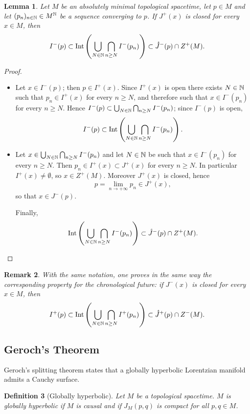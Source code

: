 \documentclass[a4paper,twoside]{article}
\newtheorem{lem}{Lemma}[section]
\newtheorem{defi}[lem]{Definition}
\newtheorem{rem}[lem]{Remark}
\begin{document}
\begin{lem}\label{lem:cup_cap} Let $M$ be an absolutely minimal topological spacetime, let $p\in M$ and let $(p_n)_{n\in \mathbb{N}}\in M^{\mathbb{N}}$ be a sequence converging to
$p$.
If $J^+(x)$ is closed for every $x\in M$, then
$$I^{-}(p)\subset \mathrm{Int}\left(\bigcup_{N\in \N}\bigcap_{n\geq N} I^-(p_n)\right)\subset \ring J^-(p) \cap Z^{+}(M). $$
\end{lem}
\begin{proof} \
\begin{itemize}
\item Let $x\in I^-(p)$; then $p\in I^+(x)$. Since $I^+(x)$ is open there exists $N\in \mathbb{N}$ such that $p_n\in I^+(x)$ for every $n\geq N$,
and therefore such that $x\in I^-(p_n)$ for every $n\geq N$.
Hence $I^-(p)\subset \bigcup_{N\in \mathbb{N}}\bigcap_{n\geq N} I^-(p_n)$;
since $I^-(p)$ is open, $$I^{-}(p)\subset \mathrm{Int}\left(\bigcup_{N\in \mathbb{N}}\bigcap_{n\geq N} I^-(p_n)\right).$$

\item Let $x\in \bigcup_{N\in \mathbb{N}}\bigcap_{n\geq N} I^-(p_n)$ and let $N\in \mathbb{N}$ be such that
$x\in I^-(p_n)$ for every $n\geq N$.
Then $p_n\in I^+(x)\subset J^+(x)$ for every $n\geq N$.
In particular $I^+(x)\neq \emptyset$, so $x\in Z^+(M)$.
Moreover $J^+(x)$ is closed, hence
$$p=\lim_{n\rightarrow +\infty } p_n \in J^+(x),$$
so that $x\in J^-(p)$.

Finally,
$$\mathrm{Int}\left(\bigcup_{N\in \N}\bigcap_{n\geq N} I^-(p_n)\right)\subset \ring J^-(p)\cap Z^+(M).$$
\end{itemize}
\end{proof}

\begin{rem} With the same notation, one proves in the same way the corresponding property for the chronological future:
if $J^-(x)$ is closed for every $x\in M$, then
$$I^{+}(p)\subset \mathrm{Int}\left(\bigcup_{N\in \N}\bigcap_{n\geq N} I^+(p_n)\right)\subset \ring J^+(p) \cap Z^{-}(M). $$
\end{rem}

\subsection{Geroch's Theorem}
Geroch's splitting theorem states that a globally hyperbolic Lorentzian manifold admits a Cauchy surface.

\begin{defi}[Globally hyperbolic] Let $M$ be a topological spacetime. $M$ is globally hyperbolic if $M$ is causal and
if $J_M(p,q)$ is compact for all $p,q\in M$.
\end{defi}
\end{document}
